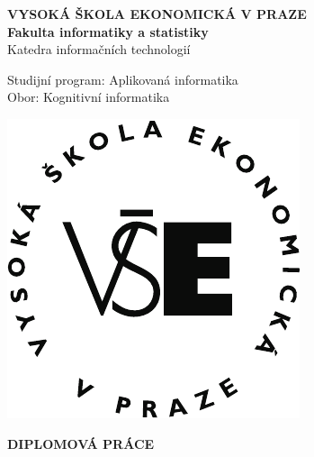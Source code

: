 
\makeatother


\thispagestyle{empty}

\begin{center}
\textsf{\textbf{\large{}VYSOKÁ ŠKOLA EKONOMICKÁ V PRAZE}}\textsf{\textbf{}}\\
\textsf{\textbf{\large{}Fakulta informatiky a statistiky}}\\
\textsf{\large{}Katedra informačních technologií}
\par\end{center}{\large \par}

\begin{center}
\textsf{Studijní program: Aplikovaná informatika}\textsf{\textbf{\large{}}}\\
\textsf{Obor: Kognitivní informatika}
\par\end{center}

\vfill

\begin{center}
\includegraphics[scale=0.8]{img/logo_vse}
\par\end{center}

\vfill

\begin{center}
\textsf{\textbf{\Large{}DIPLOMOVÁ PRÁCE}}
\par\end{center}{\Large \par}

\textsf{\medskip}

